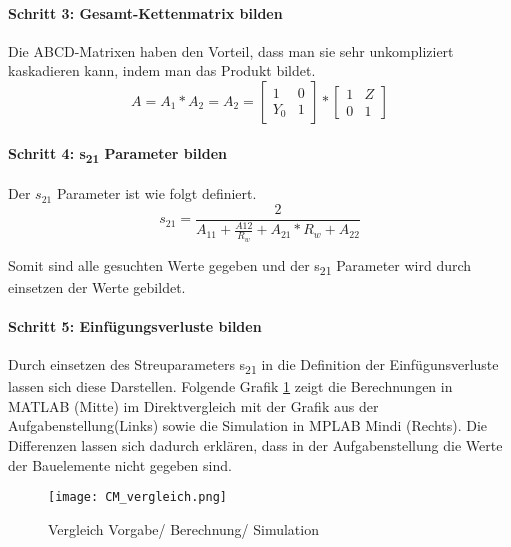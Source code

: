 \paragraph{Schritt 3: Gesamt-Kettenmatrix bilden}\label{paragraph:schritt3}
Die ABCD-Matrixen haben den Vorteil, dass man sie sehr unkompliziert kaskadieren kann, indem man das Produkt bildet.
\begin{equation}
A = A_1*A_2 = A_2 = \left[\begin{matrix}
1 & 0\\ Y_0&1 
\end{matrix}\right] * 
\left[\begin{matrix}
1 & Z\\ 0&1 
\end{matrix} \right]
\end{equation}

\paragraph{Schritt 4: s\textsubscript{21} Parameter bilden}\label{paragraph:schritt4}
Der $s_{21}$ Parameter ist wie folgt definiert.
\begin{equation}\label{equ:def_s21_aparams}
s_{21} = \frac{2}{A_{11}+\frac{A{12}}{R_w}+A_{21}*R_w+A_{22}}
\end{equation}

Somit sind alle gesuchten Werte gegeben und der s\textsubscript{21} Parameter wird durch einsetzen der Werte gebildet.

\paragraph{Schritt 5: Einfügungsverluste bilden}\label{paragraph:schritt5}
Durch einsetzen des Streuparameters s\textsubscript{21} in die Definition der Einfügunsverluste lassen sich diese Darstellen. Folgende Grafik \ref{fig:Vergleich Berechnung Simulation} zeigt die Berechnungen in MATLAB (Mitte) im Direktvergleich mit der Grafik aus der Aufgabenstellung(Links) sowie die Simulation in MPLAB Mindi (Rechts). Die Differenzen lassen sich dadurch erklären, dass in der Aufgabenstellung die Werte der Bauelemente nicht gegeben sind.
\begin{figure}[H]
	\centering
	\texttt{[image: CM\_vergleich.png]}
	\caption{Vergleich Vorgabe/ Berechnung/ Simulation}
	\label{fig:Vergleich Berechnung Simulation}
\end{figure}
